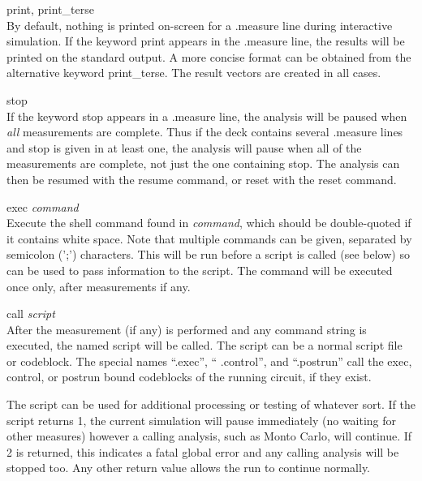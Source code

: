 \begin{description}
\item{{\vt print}, {\vt print\_terse}}\\
By default, nothing is printed on-screen for a {\vt .measure} line
during interactive simulation.  If the keyword {\vt print} appears in
the {\vt .measure} line, the results will be printed on the standard
output.  A more concise format can be obtained from the alternative
keyword {\vt print\_terse}.  The result vectors are created in all
cases.

\item{\vt stop}\\
If the keyword {\vt stop} appears in a {\vt .measure} line, the
analysis will be paused when {\it all} measurements are complete. 
Thus if the deck contains several {\vt .measure} lines and {\vt stop}
is given in at least one, the analysis will pause when all of the
measurements are complete, not just the one containing {\vt stop}. 
The analysis can then be resumed with the {\cb resume} command, or
reset with the {\cb reset} command.

\item{{\vt exec} {\it command}}\\
Execute the {\WRspice} shell command found in {\it command\/}, which
should be double-quoted if it contains white space.  Note that
multiple commands can be given, separated by semicolon ({\vt ';'})
characters.  This will be run before a script is called (see below) so
can be used to pass information to the script.  The command will be
executed once only, after measurements if any.

\item{{\vt call} {\it script}}\\
After the measurement (if any) is performed and any command string is
executed, the named script will be called.  The script can be a normal
script file or codeblock.  The special names ``{\vt .exec}'', ``{\vt
.control}'', and ``{\vt .postrun}'' call the exec, control, or postrun
bound codeblocks of the running circuit, if they exist.

The script can be used for additional processing or testing of
whatever sort.  If the script returns 1, the current simulation will
pause immediately (no waiting for other measures) however a calling
analysis, such as Monto Carlo, will continue.  If 2 is returned, this
indicates a fatal global error and any calling analysis will be
stopped too.  Any other return value allows the run to continue
normally.
\end{description}

